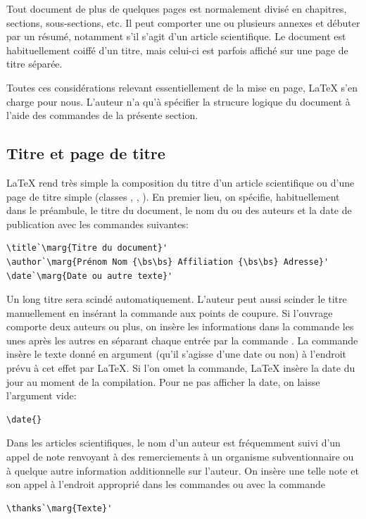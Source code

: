 Tout document de plus de quelques pages est normalement divisé en
chapitres, sections, sous-sections, etc. Il peut comporter une ou
plusieurs annexes et débuter par un résumé, notamment s'il s'agit d'un
article scientifique. Le document est habituellement coiffé d'un
titre, mais celui-ci est parfois affiché sur une page de titre
séparée.

Toutes ces considérations relevant essentiellement de la mise en page,
{\LaTeX} s'en charge pour nous. L'auteur n'a qu'à spécifier la
strucure logique du document à l'aide des commandes de la présente
section.

\subsection{Titre et page de titre}
\label{sec:organisation:parties:titre}

{\LaTeX} rend très simple la composition du titre d'un article
scientifique ou d'une page de titre simple (classes ,
, ). En premier lieu, on spécifie,
habituellement dans le préambule, le titre du document, le nom du ou
des auteurs et la date de publication avec les commandes suivantes:
\begin{lstlisting}
\title`\marg{Titre du document}'
\author`\marg{Prénom Nom {\bs\bs} Affiliation {\bs\bs} Adresse}'
\date`\marg{Date ou autre texte}'
\end{lstlisting}
Un long titre sera scindé automatiquement. L'auteur peut aussi scinder
le titre manuellement en insérant la commande {\bs\bs} aux points de
coupure. %
Si l'ouvrage comporte deux auteurs ou plus, on insère les informations
dans la commande \cmd{\author} les unes après les autres en séparant
chaque entrée par la commande \cmdprint{\and}. %
La commande \cmd{\date} insère le texte donné en argument (qu'il
s'agisse d'une date ou non) à l'endroit prévu à cet effet par
{\LaTeX}. Si l'on omet la commande, {\LaTeX} insère la date du jour au
moment de la compilation. Pour ne pas afficher la date, on laisse
l'argument vide:
\begin{lstlisting}
\date{}
\end{lstlisting}

Dans les articles scientifiques, le nom d'un auteur est fréquemment
suivi d'un appel de note renvoyant à des remerciements à un organisme
subventionnaire ou à quelque autre information additionnelle sur
l'auteur. On insère une telle note et son appel à l'endroit approprié
dans les commandes \cmd{\title} ou \cmd{\author} avec la commande
\begin{lstlisting}
\thanks`\marg{Texte}'
\end{lstlisting}

